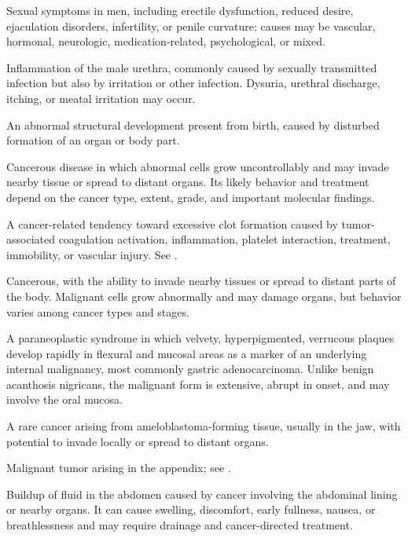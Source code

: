  Sexual symptoms in men, including erectile dysfunction, reduced desire, ejaculation disorders, infertility, or penile curvature; causes may be vascular, hormonal, neurologic, medication-related, psychological, or mixed.

 Inflammation of the male urethra, commonly caused by sexually transmitted infection but also by irritation or other infection. Dysuria, urethral discharge, itching, or meatal irritation may occur.

 An abnormal structural development present from birth, caused by disturbed formation of an organ or body part.

 Cancerous disease in which abnormal cells grow uncontrollably and may invade nearby tissue or spread to distant organs. Its likely behavior and treatment depend on the cancer type, extent, grade, and important molecular findings.

 A cancer-related tendency toward excessive clot formation caused by tumor-associated coagulation activation, inflammation, platelet interaction, treatment, immobility, or vascular injury. See .

 Cancerous, with the ability to invade nearby tissues or spread to distant parts of the body. Malignant cells grow abnormally and may damage organs, but behavior varies among cancer types and stages.

 A paraneoplastic syndrome in which velvety, hyperpigmented, verrucous plaques develop
rapidly in flexural and mucosal areas as a marker of an underlying internal malignancy,
most commonly gastric adenocarcinoma. Unlike benign acanthosis nigricans, the malignant
form is extensive, abrupt in onset, and may involve the oral mucosa.

 A rare cancer arising from ameloblastoma-forming tissue, usually in the jaw, with potential to invade locally or spread to distant organs.

 Malignant tumor arising in the appendix; see .

 Buildup of fluid in the abdomen caused by cancer involving the abdominal lining or nearby organs. It can cause swelling, discomfort, early fullness, nausea, or breathlessness and may require drainage and cancer-directed treatment.

